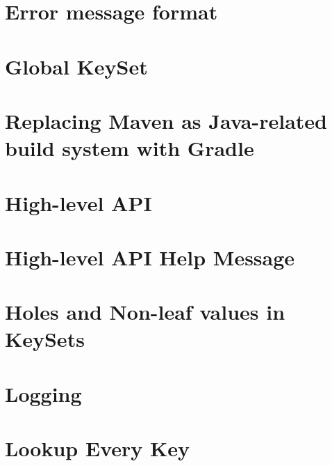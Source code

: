 \let\mypdfximage\pdfximage\def\pdfximage{\immediate\mypdfximage}\documentclass[twoside]{book}
\newcommand{\+}{\discretionary{\mbox{\scriptsize$\hookleftarrow$}}{}{}}
\begin{document}
\chapter{Error message format}
\label{doc_decisions_6_implemented_error_message_format_md}

\chapter{Global Key\+Set}
\label{doc_decisions_6_implemented_global_keyset_md}

\chapter{Replacing Maven as Java-\/related build system with Gradle}
\label{doc_decisions_6_implemented_gradle_md}

\chapter{High-\/level API}
\label{doc_decisions_6_implemented_high_level_api_md}

\chapter{High-\/level API Help Message}
\label{doc_decisions_6_implemented_highlevel_help_message_md}

\chapter{Holes and Non-\/leaf values in Key\+Sets}
\label{doc_decisions_6_implemented_holes_md}

\chapter{Logging}
\label{doc_decisions_6_implemented_logging_md}

\chapter{Lookup Every Key}
\label{doc_decisions_6_implemented_lookup_every_key_md}

\end{document}
